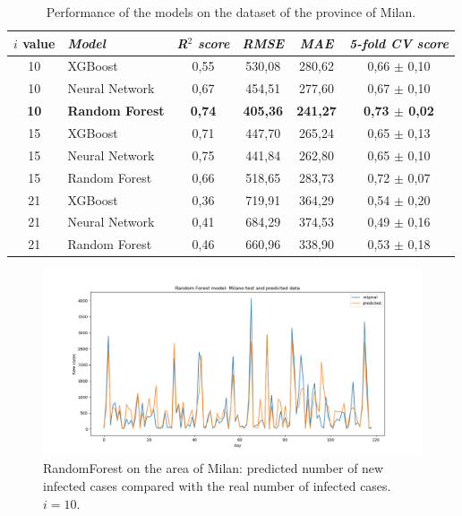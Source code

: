 \documentclass[review]{elsarticle}
\begin{document}
\begin{table}[htbp]
	\begin{center}
	\caption{Performance of the models on the dataset of the province of Milan.}
		\begin{tabular}{clcccc}
			$i$ value & \textit{Model} & \textit{R$ ^{2} $ score} & \textit{RMSE} & \textit{MAE} & \textit{5-fold CV score} \\
			\hline
			10 & XGBoost & 0,55 & 530,08 & 280,62 & 0,66 $ \pm $ 0,10 \\
			10 & Neural Network & 0,67 & 454,51 & 277,60 & 0,67 $ \pm $ 0,10 \\
			\textbf{10} & \textbf{Random Forest} & \textbf{0,74} & \textbf{405,36} & \textbf{241,27} & \textbf{0,73 $ \pm $ 0,02} \\
			15 & XGBoost & 0,71 & 447,70 & 265,24 & 0,65 $ \pm $ 0,13 \\
			15 & Neural Network & 0,75 & 441,84 & 262,80 & 0,65 $ \pm $ 0,10 \\
			15 & Random Forest & 0,66 & 518,65 & 283,73 & 0,72 $ \pm $ 0,07 \\
			21 & XGBoost & 0,36 & 719,91 & 364,29 & 0,54 $ \pm $ 0,20 \\
			21 & Neural Network & 0,41 & 684,29 & 374,53 & 0,49 $ \pm $ 0,16\\
			21 & Random Forest & 0,46 & 660,96 & 338,90 & 0,53 $ \pm $ 0,18 \\
			\hline
		\end{tabular}
	\end{center}
	\label{tab:risultati_milano}
\end{table}

\begin{figure}[htbp]
	\centering
	\includegraphics[width=\linewidth]{milan10ggrf}
	\caption{RandomForest on the area of Milan: predicted number of new infected cases compared with the real number of infected cases. $ i = 10 $.}
	\label{fig:milan10ggrf}
\end{figure}
\end{document}
